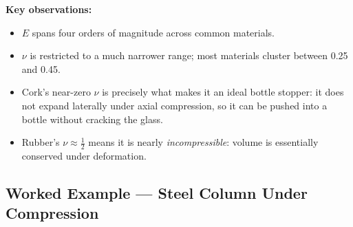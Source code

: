 \textbf{Key observations:}
\begin{itemize}
    \item $E$ spans four orders of magnitude across common materials.
    \item $\nu$ is restricted to a much narrower range; most materials
          cluster between 0.25 and 0.45.
    \item Cork's near-zero $\nu$ is precisely what makes it an ideal
          bottle stopper: it does not expand laterally under axial
          compression, so it can be pushed into a bottle without cracking
          the glass.
    \item Rubber's $\nu \approx \frac{1}{2}$ means it is nearly
          \emph{incompressible}: volume is essentially conserved under
          deformation.
\end{itemize}

\subsection{Worked Example — Steel Column Under Compression}
\label{subsec:lec02:example}

